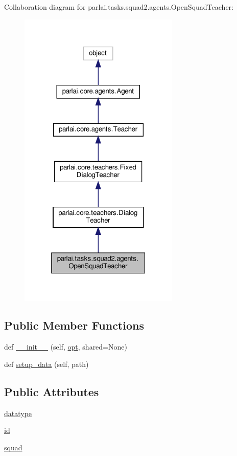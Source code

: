 Collaboration diagram for parlai.\+tasks.\+squad2.\+agents.\+Open\+Squad\+Teacher\+:
\nopagebreak
\begin{figure}[H]
\begin{center}
\leavevmode
\includegraphics[width=217pt]{dc/d15/classparlai_1_1tasks_1_1squad2_1_1agents_1_1OpenSquadTeacher__coll__graph}
\end{center}
\end{figure}
\subsection*{Public Member Functions}
\begin{DoxyCompactItemize}
\item 
def \hyperlink{classparlai_1_1tasks_1_1squad2_1_1agents_1_1OpenSquadTeacher_a97032124add4cb349ff65ac04900da82}{\+\_\+\+\_\+init\+\_\+\+\_\+} (self, \hyperlink{classparlai_1_1core_1_1agents_1_1Teacher_a3ce6243860ce978a897922863ed32fa4}{opt}, shared=None)
\item 
def \hyperlink{classparlai_1_1tasks_1_1squad2_1_1agents_1_1OpenSquadTeacher_a7095abdf14125fc5cdae594fb63b71a0}{setup\+\_\+data} (self, path)
\end{DoxyCompactItemize}
\subsection*{Public Attributes}
\begin{DoxyCompactItemize}
\item 
\hyperlink{classparlai_1_1tasks_1_1squad2_1_1agents_1_1OpenSquadTeacher_ac0e68cddc67c52ee994725567a6ff45e}{datatype}
\item 
\hyperlink{classparlai_1_1tasks_1_1squad2_1_1agents_1_1OpenSquadTeacher_afee4b62658417abd64ef8bd57bbf6620}{id}
\item 
\hyperlink{classparlai_1_1tasks_1_1squad2_1_1agents_1_1OpenSquadTeacher_a80a634305ad2a0af202031e430ddf3af}{squad}
\end{DoxyCompactItemize}
